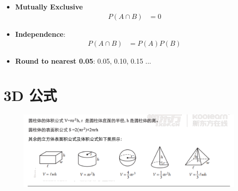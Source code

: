 \begin{multicols}{2}
\begin{itemize}
    \item \textbf{Mutually Exclusive}
    \begin{align}
      P\left( A \cap B \right) &= 0
    \end{align}

    \item \textbf{Independence}:
    \begin{align}
      P\left( A \cap B \right) &= P\left( A \right) P\left( B \right)
    \end{align}

    \item \textbf{Round to nearest 0.05}: 0.05, 0.10, 0.15 ...
  \end{itemize}
\end{multicols}

\section{3D 公式}

  \begin{figure}[H]
    \centering
    \includegraphics[width=\columnwidth]{images/remember-before-test/3d-equations.png}
  \end{figure}
